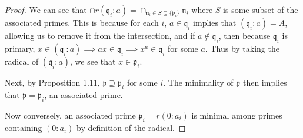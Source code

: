 \begin{proof}
	We can see that $\cap r(\mathfrak{q}_i:a) = \cap_{\mathfrak{n}_i \in S \subseteq \{\mathfrak{p}_i\}  } \mathfrak{n}_i$ where $S $ is some subset of the associated primes.
	This is because for each $i $, $a \in \mathfrak{q}_i $ implies that $(\mathfrak{q}_i:a) =A$, allowing us to remove it from the intersection, and if $a\notin \mathfrak{q}_i $, then because $\mathfrak{q}_i $ is primary, $x\in (\mathfrak{q}_i:a) \implies ax \in \mathfrak{q}_i \implies x^a \in \mathfrak{q}_i $ for some $a $.
	Thus by taking the radical of $(\mathfrak{q}_i:a) $, we see that $x\in \mathfrak{p}_i $.

	Next, by Proposition 1.11, $\mathfrak{p} \supseteq \mathfrak{p}_i $ for some $i $.
	The minimality of $\mathfrak{p} $ then implies that $\mathfrak{p} = \mathfrak{p}_i $, an associated prime.

	Now conversely, an associated prime $\mathfrak{p}_i = r(0:a_i) $ is minimal among primes containing $(0:a_i) $ by definition of the radical.
\end{proof}

